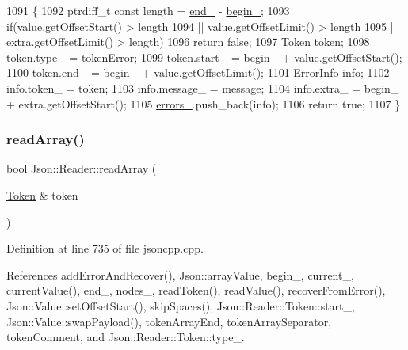 \begin{DoxyCode}
1091                                                                                             \{
1092   ptrdiff\_t \textcolor{keyword}{const} length = \hyperlink{class_json_1_1_reader_a714793579cbf4ee7c5a7223d2c8d77c1}{end\_} - \hyperlink{class_json_1_1_reader_a327166839022ea91f0a8290960a8af76}{begin\_};
1093   \textcolor{keywordflow}{if}(value.getOffsetStart() > length
1094     || value.getOffsetLimit() > length
1095     || extra.getOffsetLimit() > length)
1096     \textcolor{keywordflow}{return} \textcolor{keyword}{false};
1097   Token token;
1098   token.type\_ = \hyperlink{class_json_1_1_reader_aa35e6ab574dc399a0a645ad98ed66bc9a55d1ab9135c3d068b57fafdbabfa569a}{tokenError};
1099   token.start\_ = begin\_ + value.getOffsetStart();
1100   token.end\_ = begin\_ + value.getOffsetLimit();
1101   ErrorInfo info;
1102   info.token\_ = token;
1103   info.message\_ = message;
1104   info.extra\_ = begin\_ + extra.getOffsetStart();
1105   \hyperlink{class_json_1_1_reader_a1bbce45dc4df753bed60c129f4b5147c}{errors\_}.push\_back(info);
1106   \textcolor{keywordflow}{return} \textcolor{keyword}{true};
1107 \}
\end{DoxyCode}
\mbox{\label{class_json_1_1_reader_afd9a30c0af205c9f327613f486fae6b8}} 
\subsubsection{\texorpdfstring{read\+Array()}{readArray()}}
{\footnotesize\ttfamily bool Json\+::\+Reader\+::read\+Array (\begin{DoxyParamCaption}\item[{\hyperlink{class_json_1_1_reader_1_1_token}{Token} \&}]{token }\end{DoxyParamCaption})\hspace{0.3cm}{\ttfamily [private]}}



Definition at line 735 of file jsoncpp.\+cpp.



References add\+Error\+And\+Recover(), Json\+::array\+Value, begin\+\_\+, current\+\_\+, current\+Value(), end\+\_\+, nodes\+\_\+, read\+Token(), read\+Value(), recover\+From\+Error(), Json\+::\+Value\+::set\+Offset\+Start(), skip\+Spaces(), Json\+::\+Reader\+::\+Token\+::start\+\_\+, Json\+::\+Value\+::swap\+Payload(), token\+Array\+End, token\+Array\+Separator, token\+Comment, and Json\+::\+Reader\+::\+Token\+::type\+\_\+.




